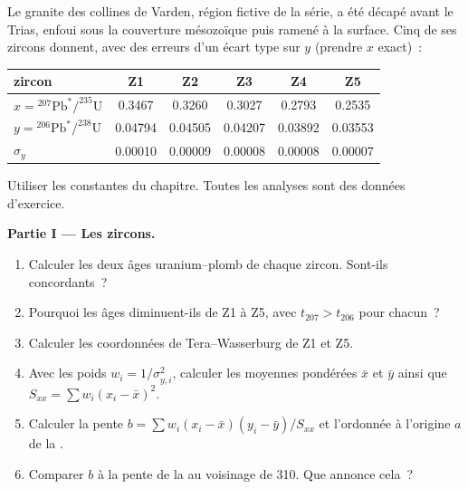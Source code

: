 \begin{problem}\label{pb:b3:advanced-geochronology:1}
Le granite des collines de Varden, région fictive de la série, a été décapé
avant le Trias, enfoui sous la couverture mésozoïque puis ramené à la
surface. Cinq de ses zircons donnent, avec des erreurs d'un écart type sur $y$
(prendre $x$ exact)~:
\begin{center}
\small
\begin{tabular}{|l|ccccc|}
\hline
zircon & Z1 & Z2 & Z3 & Z4 & Z5 \\
\hline
$x = {}^{207}\mathrm{Pb}^*/^{235}\mathrm U$ & 0.3467 & 0.3260 & 0.3027 & 0.2793 & 0.2535 \\
$y = {}^{206}\mathrm{Pb}^*/^{238}\mathrm U$ & 0.04794 & 0.04505 & 0.04207 & 0.03892 & 0.03553 \\
$\sigma_y$ & 0.00010 & 0.00009 & 0.00008 & 0.00008 & 0.00007 \\
\hline
\end{tabular}
\end{center}
Utiliser les constantes du chapitre. Toutes les analyses sont des données d'exercice.

\medskip\noindent\textbf{Partie I --- Les zircons.}
\begin{enumerate}
\item Calculer les deux âges uranium--plomb de chaque zircon. Sont-ils concordants~?
\item Pourquoi les âges diminuent-ils de Z1 à Z5, avec $t_{207} > t_{206}$ pour
chacun~?
\item Calculer les coordonnées de Tera--Wasserburg de Z1 et Z5.
\item Avec les poids $w_i = 1/\sigma_{y,i}^2$, calculer les moyennes pondérées
$\bar x$ et $\bar y$ ainsi que $S_{xx} = \sum w_i(x_i - \bar x)^2$.
\item Calculer la pente $b = \sum w_i(x_i - \bar x)(y_i - \bar y)/S_{xx}$ et
l'ordonnée à l'origine $a$ de la .
\item Comparer $b$ à la pente de la  au voisinage de \qty{310}{\Ma}. Que
annonce cela~?
\end{enumerate}


\end{problem}

